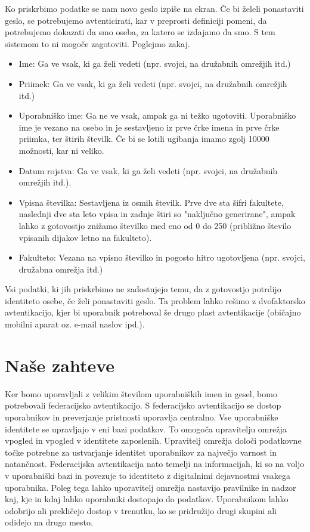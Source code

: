 \documentclass[a4paper,12pt,openright]{book}
\begin{document}
{Ko priskrbimo podatke se nam novo geslo izpiše na ekran. Če bi želeli ponastaviti geslo, se potrebujemo avtenticirati, kar v preprosti definiciji pomeni, da potrebujemo dokazati da smo oseba, za katero se izdajamo da smo. S tem sistemom to ni mogoče zagotoviti. Poglejmo zakaj.

\begin{itemize}
    \item Ime: Ga ve vsak, ki ga želi vedeti (npr. svojci, na družabnih omrežjih itd.)
    \item Priimek: Ga ve vsak, ki ga želi vedeti (npr. svojci, na družabnih omrežjih itd.)
    \item Uporabniško ime: Ga ne ve vsak, ampak ga ni težko ugotoviti. Uporabniško ime je vezano na osebo in je sestavljeno iz prve črke imena in prve črke priimka, ter štirih številk. Če bi se lotili ugibanja imamo zgolj 10000 možnosti, kar ni veliko.
    \item Datum rojstva: Ga ve vsak, ki ga želi vedeti (npr. svojci, na družabnih omrežjih itd.).
    \item Vpisna številka: Sestavljena iz osmih številk. Prve dve sta šifri fakultete, naslednji dve sta leto vpisa in zadnje štiri so "naključno generirane", ampak lahko z gotovostjo znižamo številko med eno od 0 do 250 (približno število vpisanih dijakov letno na fakulteto).
    \item Fakulteto: Vezana na vpisno številko in pogosto hitro ugotovljena (npr. svojci, družabna omrežja itd.)
\end{itemize}

Vsi podatki, ki jih priskrbimo ne zadostujejo temu, da z gotovostjo potrdijo identiteto osebe, če želi ponastaviti geslo. Ta problem lahko rešimo z dvofaktorsko avtentikacijo, kjer bi uporabnik potreboval še drugo plast avtentikacije (običajno mobilni aparat oz. e-mail naslov ipd.). 

\section{Naše zahteve}

Ker bomo uporavljali z velikim številom uporabniških imen in gesel, bomo potrebovali federacijsko avtentikacijo. S federacijsko avtentikacijo se dostop uporabnikov in preverjanje pristnosti uporavlja centralno. Vse uporabniške identitete se upravljajo v eni bazi podatkov. To omogoča upravitelju omrežja vpogled in vpogled v identitete zaposlenih. Upravitelj omrežja določi podatkovne točke potrebne za ustvarjanje identitet uporabnikov za največjo varnost in natančnost. Federacijska avtentikacija nato temelji na informacijah, ki so na voljo v uporabniški bazi in povezuje to identiteto z digitalnimi dejavnostmi vsakega uporabnika. Poleg tega lahko uporavitelj omrežja nastavijo pravilnike in nadzor kaj, kje in kdaj lahko uporabniki dostopajo do podatkov. Uporabnikom lahko odobrijo ali prekličejo dostop v trenutku, ko se pridružijo drugi skupini ali odidejo na drugo mesto.
\newline

}
\end{document}
